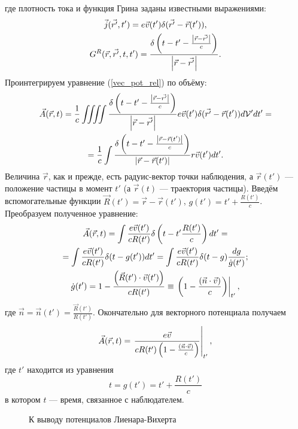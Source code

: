     где плотность тока и функция Грина заданы известными выражениями:
    \begin{gather*}
        \vec{j}(\vec{r'}, t') = e\vec{v}(t')\delta(\vec{r'} - \vec{r}(t')),\\
        G^R(\vec{r}, \vec{r'}, t, t') = \frac{\delta\left({t - t' - \frac{\left|{\vec{r} - \vec{r'}}\right|}{c}}\right)}{\left|{\vec{r} - \vec{r'}}\right|}.
    \end{gather*}
    Проинтегрируем уравнение (\ref{vec_pot_rel}) по объёму:
    \begin{gather*}
        \vec{A}(\vec{r}, t) = \frac 1c \iiiint \frac{\delta\left({t - t' - \frac{\left|{\vec{r} - \vec{r'}}\right|}{c}}\right)}{\left|{\vec{r} - \vec{r'}}\right|}
        e\vec{v}(t')\delta(\vec{r'} - \vec{r}(t')) d\mathcal{V}'dt' = \\ =
        \frac 1c \int \frac{\delta\left({t - t' - \frac{\left|{\vec{r} - \vec{r}(t')}\right|}{c}}\right)}{\left|{\vec{r} - \vec{r}(t')}\right|} r\vec{v}(t')dt'.
    \end{gather*}
    Величина $\vec{r}$, как и прежде, есть радуис-вектор точки наблюдения, а $\vec{r}(t')$ --- положение частицы в момент $t'$ (а $\vec{r}(t)$ --- траектория частицы).
    Введём вспомогательные функции $\vec{R}(t') = \vec{r} - \vec{r}(t')$, $g(t') = t' + \frac{R(t')}{c}$. Преобразуем полученное уравнение:
    \begin{gather*}
        \vec{A}(\vec{r}, t) = \int \frac{e \vec{v}(t')}{cR(t')} \delta\left({t - t' \frac{R(t')}{c}}\right) dt'= \\ =
        \int \frac{e\vec{v}(t')}{cR(t')}\delta(t - g(t')) dt' = \int \frac{e\vec{v}(t')}{cR(t')}\delta(t - g)\frac{dg}{\dot{g}(t')}; \\
        \dot{g}(t') = 1 - \frac{\left({\vec R(t')\cdot\vec v(t')}\right)}{cR(t')} \equiv \left. \left({1 - \frac{\left({\vec{n}\cdot\vec{v}}\right)}{c}}\right) \right|_{t'},
    \end{gather*}
    где $\vec{n} = \vec{n}(t') = \frac{\vec{R}(t')}{R(t')}$. Окончательно для векторного потенциала получаем
    \begin{equation}
        \vec{A}(\vec{r}, t) = \left. \frac{e\vec{v}}{cR(t') \left({1 - \frac{\left({\vec{n}\cdot\vec{v}}\right)}{c}}\right)} \right|_{t'}, \label{LV_A}
    \end{equation}
    где $t'$ находится из уравнения
    \begin{equation}
        t = g(t') = t' + \frac{R(t')}{c} \label{rel_abs_time}
    \end{equation}
    в котором $t$ --- время, связанное с наблюдателем. 
    \begin{figure}[t]
        \centering{
            
        }
        \caption{К выводу потенциалов Лиенара-Вихерта}
    \end{figure}
